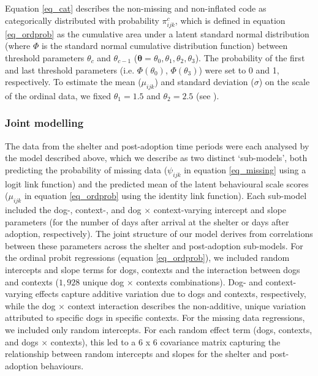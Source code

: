 \documentclass[12pt]{article}
\begin{document}
Equation \ref{eq_cat} describes the non-missing and non-inflated code as categorically distributed with probability $\pi_{ijk}^c$, which is defined in equation \ref{eq_ordprob} as the cumulative area under a latent standard normal distribution (where $\Phi$ is the standard normal cumulative distribution function) between threshold parameters $\theta_{c}$ and $\theta_{c-1}$ ($\boldsymbol{\theta} = {\theta_{0}, \theta_{1}, \theta_{2}, \theta_{3}}$). The probability of the first and last threshold parameters (i.e. $\Phi({\theta_{0}})$, $\Phi({\theta_{3}})$) were set to 0 and 1, respectively. To estimate the mean ($\mu_{ijk}$) and standard deviation ($\sigma$) on the scale of the ordinal data, we fixed $\theta_{1} = 1.5$ and $\theta_{2} = 2.5$ (see \cite{kruschke2014}).

\subsubsection{Joint modelling}
The data from the shelter and post-adoption time periods were each analysed by the model described above, which we describe as two distinct `sub-models', both predicting the probability of missing data ($\psi_{ijk}$ in equation \ref{eq_missing} using a logit link function) and the predicted mean of the latent behavioural scale scores ($\mu_{ijk}$ in equation \ref{eq_ordprob} using the identity link function). Each sub-model included the dog-, context-, and dog $\times$ context-varying intercept and slope parameters (for the number of days after arrival at the shelter or days after adoption, respectively). The joint structure of our model derives from correlations between these parameters across the shelter and post-adoption sub-models. For the ordinal probit regressions (equation \ref{eq_ordprob}), we included random intercepts and slope terms for dogs, contexts and the interaction between dogs and contexts ($1,928$ unique dog $\times$ contexts combinations). Dog- and context-varying effects capture additive variation due to dogs and contexts, respectively, while the dog $\times$ context interaction describes the non-additive, unique variation attributed to specific dogs in specific contexts. For the missing data regressions, we included only random intercepts. For each random effect term (dogs, contexts, and dogs $\times$ contexts), this led to a 6 x 6 covariance matrix capturing the relationship between random intercepts and slopes for the shelter and post-adoption behaviours.
\end{document}
